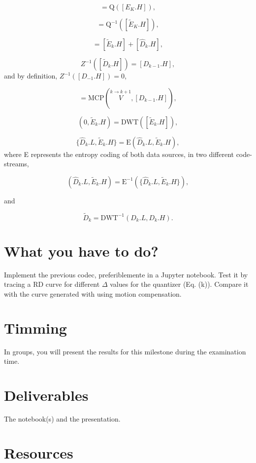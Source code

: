 \begin{equation}
  [\tilde{E}_k.H] = \text{Q}([E_K.H]),
  \tag{j}
\end{equation}

\begin{equation}
  [\tilde{E}_k.H] = \text{Q}^{-1}([\tilde{E}_K.H]),
  \tag{k}
\end{equation}

\begin{equation}
  [\tilde{D}_k.H] = [\tilde{E}_k.H] + [\hat{D}_k.H],
  \tag{l}
\end{equation}

\begin{equation}
  Z^{-1}([\tilde{D}_k.H]) = [D_{k-1}.H],
  \tag{m}
\end{equation}
and by definition, $Z^{-1}([D_{-1}.H]) = 0$,

\begin{equation}
  [\hat{D}_k.H] = \text{MCP}(\overset{k\rightarrow k+1}{V}, [D_{k-1}.H]),
  \tag{n}
\end{equation}

\begin{equation}
  (0, \tilde{E}_k.H) = \text{DWT}([\tilde{E}_k.H]),
  \tag{o}
\end{equation}

\begin{equation}
  \{\hat{D}_k.L, \tilde{E}_k.H\} = \text{E}(\hat{D}_k.L, \tilde{E}_k.H),
  \tag{p}
\end{equation}
where E represents the entropy coding of both data sources, in two
different code-streams,

\begin{equation}
  (\hat{D}_k.L, \tilde{E}_k.H) = \text{E}^{-1}(\{\hat{D}_k.L, \tilde{E}_k.H\}),
  \tag{q}
\end{equation}

and

\begin{equation}
  \tilde{D}_k = \text{DWT}^{-1}(D_k.L, D_k.H).
  \tag{r}
\end{equation}

\section{What you have to do?}

Implement the previous codec, preferiblemente in a Jupyter
notebook. Test it by tracing a RD curve for different $\Delta$ values
for the quantizer (Eq. (k)). Compare it with the curve generated with
using motion compensation.

\section{Timming}

In groups, you will present the results for this milestone during the
examination time.

\section{Deliverables}

The notebook(s) and the presentation.

\section{Resources}


